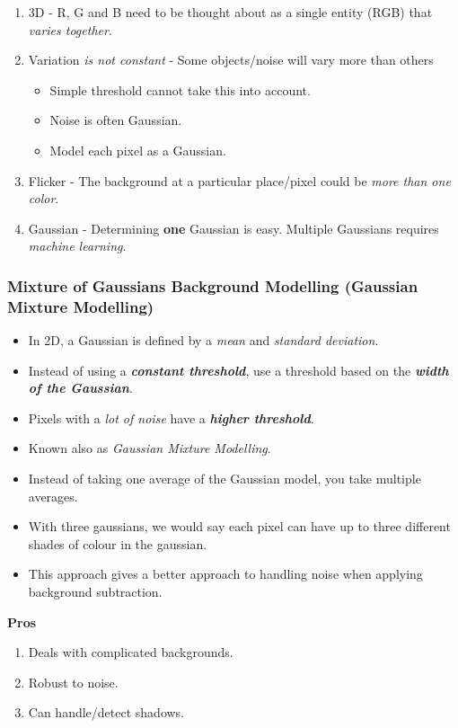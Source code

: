 \documentclass[english, 10pt]{article}
\begin{document}
\begin{enumerate}
\item 3D - R, G and B need to be thought about as a single entity (RGB) that \textit{varies together}.
\item Variation \textit{is not constant} - Some objects/noise will vary more than others
\begin{itemize}
\item Simple threshold cannot take this into account.
\item Noise is often Gaussian.
\item Model each pixel as a Gaussian.
\end{itemize}
\item Flicker - The background at a particular place/pixel could be \textit{more than one color}.
\item Gaussian - Determining \textbf{one} Gaussian is easy. Multiple Gaussians requires \textit{machine learning}.
\end{enumerate}

\subsubsection{Mixture of Gaussians Background Modelling (Gaussian Mixture Modelling)}

\begin{itemize}
\item In 2D, a Gaussian is defined by a \textit{mean} and \textit{standard deviation}. 
\item Instead of using a \textbf{\textit{constant threshold}}, use a threshold based on the \textit{\textbf{width of the Gaussian}}.
\item Pixels with a \textit{lot of noise} have a \textbf{\textit{higher threshold}}. 
\item Known also as \textit{Gaussian Mixture Modelling}.
\item Instead of taking one average of the Gaussian model, you take multiple averages. 
\item With three gaussians, we would say each pixel can have up to three different shades of colour in the gaussian.
\item This approach gives a better approach to handling noise when applying background subtraction. 
\end{itemize}

\textbf{Pros}

\begin{enumerate}
\item Deals with complicated backgrounds.
\item Robust to noise.
\item Can handle/detect shadows.
\end{enumerate}
\end{document}
